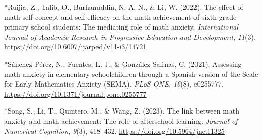 \documentclass[man,a4paper,12pt,floatsintext,nolmodern,notab]{apa7}
\begin{document}
\par\noindent\hangindent=0.5in *Ruijia, Z., Talib, O., Burhanuddin, N. A. N., \& Li, W. (2022). The effect of math self-concept and self-efficacy on the math achievement of sixth-grade primary school students: The mediating role of math anxiety. \textit{International Journal of Academic Research in Progressive Education and Development}, \textit{11}(3). \url{https://doi.org/10.6007/ijarped/v11-i3/14721}\par
\par\noindent\hangindent=0.5in *Sánchez-Pérez, N., Fuentes, L. J., \& González-Salinas, C. (2021). Assessing math anxiety in elementary schoolchildren through a Spanish version of the Scale for Early Mathematics Anxiety (SEMA). \textit{PLoS ONE}, \textit{16}(8), e0255777. \url{https://doi.org/10.1371/journal.pone.0255777}\par
\par\noindent\hangindent=0.5in *Song, S., Li, T., Quintero, M., \& Wang, Z. (2023). The link between math anxiety and math achievement: The role of afterschool learning. \textit{Journal of Numerical Cognition}, \textit{9}(3), 418–432. \url{https://doi.org/10.5964/jnc.11325}\par
\end{document}
